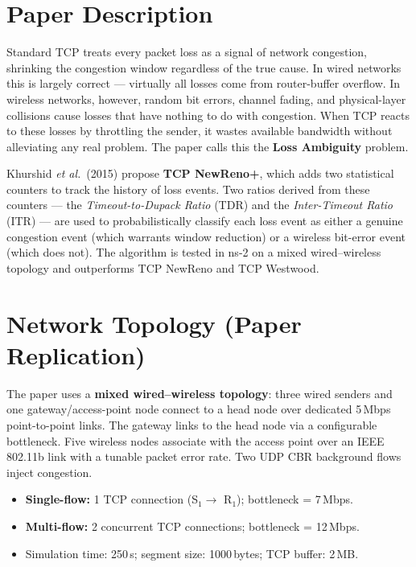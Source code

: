 \documentclass[12pt,a4paper]{article}
\begin{document}
\section{Paper Description}

Standard TCP treats every packet loss as a signal of network congestion, shrinking
the congestion window regardless of the true cause. In wired networks this is
largely correct — virtually all losses come from router-buffer overflow.
In wireless networks, however, random bit errors, channel fading, and physical-layer
collisions cause losses that have nothing to do with congestion. When TCP reacts to
these losses by throttling the sender, it wastes available bandwidth without
alleviating any real problem. The paper calls this the \textbf{Loss Ambiguity}
problem.

Khurshid \textit{et al.}\ (2015) propose \textbf{TCP NewReno+}, which adds two
statistical counters to track the history of loss events. Two ratios derived from
these counters — the \emph{Timeout-to-Dupack Ratio} (TDR) and the
\emph{Inter-Timeout Ratio} (ITR) — are used to probabilistically classify each
loss event as either a genuine congestion event (which warrants window reduction)
or a wireless bit-error event (which does not). The algorithm is tested in ns-2 on
a mixed wired–wireless topology and outperforms TCP NewReno and TCP Westwood.

\section{Network Topology (Paper Replication)}
\label{sec:paper-topo}

The paper uses a \textbf{mixed wired–wireless topology}: three wired senders and
one gateway/access-point node connect to a head node over dedicated 5\,Mbps
point-to-point links. The gateway links to the head node via a configurable
bottleneck. Five wireless nodes associate with the access point over an
IEEE\,802.11b link with a tunable packet error rate. Two UDP CBR background flows
inject congestion.

\begin{itemize}[noitemsep]
  \item \textbf{Single-flow:} 1 TCP connection (S$_1 \to$ R$_1$);
        bottleneck = 7\,Mbps.
  \item \textbf{Multi-flow:} 2 concurrent TCP connections;
        bottleneck = 12\,Mbps.
  \item Simulation time: 250\,s; segment size: 1000\,bytes; TCP buffer: 2\,MB.
\end{itemize}
\end{document}
